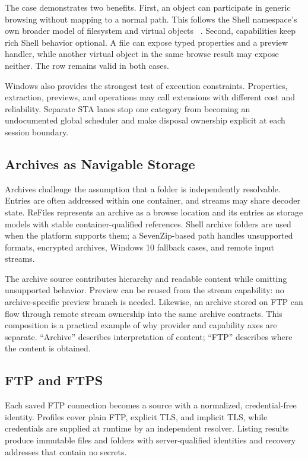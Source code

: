 \documentclass[10pt,a4paper,twoside]{article}
\begin{document}
The case demonstrates two benefits. First, an object can participate in generic browsing without mapping to a
normal path. This follows the Shell namespace's own broader model of filesystem and virtual objects
~\cite{windows-shell-namespace}. Second, capabilities keep rich Shell behavior optional. A file can expose typed
properties and a preview handler, while another virtual object in the same browse result may expose neither. The
row remains valid in both cases.

Windows also provides the strongest test of execution constraints. Properties, extraction, previews, and
operations may call extensions with different cost and reliability. Separate STA lanes stop one category from
becoming an undocumented global scheduler and make disposal ownership explicit at each session boundary.

\subsection{Archives as Navigable Storage}

Archives challenge the assumption that a folder is independently resolvable. Entries are often addressed within
one container, and streams may share decoder state. ReFiles represents an archive as a browse location and its
entries as storage models with stable container-qualified references. Shell archive folders are used when the
platform supports them; a SevenZip-based path handles unsupported formats, encrypted archives, Windows 10
fallback cases, and remote input streams.

The archive source contributes hierarchy and readable content while omitting unsupported behavior. Preview can
be reused from the stream capability: no archive-specific preview branch is needed. Likewise, an archive stored
on FTP can flow through remote stream ownership into the same archive contracts. This composition is a practical
example of why provider and capability axes are separate. ``Archive'' describes interpretation of content;
``FTP'' describes where the content is obtained.

\subsection{FTP and FTPS}

Each saved FTP connection becomes a source with a normalized, credential-free identity. Profiles cover plain
FTP, explicit TLS, and implicit TLS, while credentials are supplied at runtime by an independent resolver.
Listing results produce immutable files and folders with server-qualified identities and recovery addresses that
contain no secrets.
\end{document}
